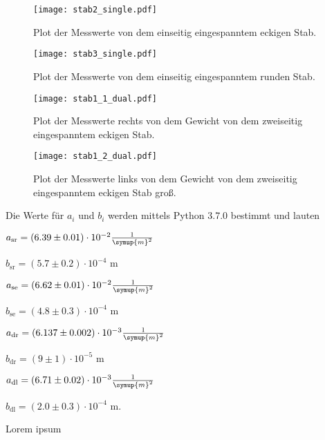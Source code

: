 \begin{figure}
  \centering
  \texttt{[image: stab2\_single.pdf]}
  \caption{Plot der Messwerte von dem einseitig eingespanntem eckigen Stab.}
  \label{fig:stab2-plot}
\end{figure}

\begin{figure}
  \centering
  \texttt{[image: stab3\_single.pdf]}
  \caption{Plot der Messwerte von dem einseitig eingespanntem runden Stab.}
  \label{fig:stab3-plot}
\end{figure}

\begin{figure}
  \centering
  \texttt{[image: stab1\_1\_dual.pdf]}
  \caption{Plot der Messwerte rechts von dem Gewicht von dem zweiseitig eingespanntem eckigen Stab.}
  \label{fig:stab1_1-plot}
\end{figure}

\begin{figure}
  \centering
  \texttt{[image: stab1\_2\_dual.pdf]}
  \caption{Plot der Messwerte links von dem Gewicht von dem zweiseitig eingespanntem eckigen Stab groß.}
  \label{fig:stab1_2-plot}
\end{figure}

Die Werte für $a_i$ und $b_i$ werden mittels Python 3.7.0 bestimmt und lauten

\vspace{2em}
\centerline{$a_\text{sr} = (6.39 \pm 0.01) \cdot 10^{-2} \frac{1}{\symup{m}^2}$}

\centerline{$b_\text{sr} = (5.7 \pm 0.2) \cdot 10^{-4} $ m}
\vspace{1em}
\centerline{$a_\text{se} = (6.62 \pm 0.01) \cdot 10^{-2} \frac{1}{\symup{m}^2}$}

\centerline{$b_\text{se} = (4.8 \pm 0.3) \cdot 10^{-4} $ m}
\vspace{1em}
\centerline{$a_\text{dr} = (6.137 \pm 0.002) \cdot 10^{-3} \frac{1}{\symup{m}^2} $}

\centerline{$b_\text{dr} = (9 \pm 1) \cdot 10^{-5} $ m}
\vspace{1em}
\centerline{$a_\text{dl} = (6.71 \pm 0.02) \cdot 10^{-3} \frac{1}{\symup{m}^2} $}

\centerline{$b_\text{dl} = (2.0 \pm 0.3) \cdot 10^{-4} $ m.}
\vspace{1em}
Lorem ipsum